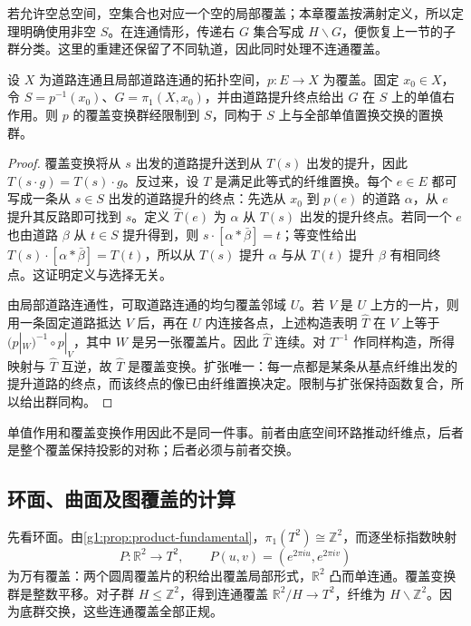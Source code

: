 若允许空总空间，空集合也对应一个空的局部覆盖；本章覆盖按满射定义，所以定理明确使用非空 \(S\)。在连通情形，传递右 \(G\) 集合写成 \(H\backslash G\)，便恢复上一节的子群分类。这里的重建还保留了不同轨道，因此同时处理不连通覆盖。

\begin{corollary}\label{g1:cor:deck-centralizer}
	设 \(X\) 为道路连通且局部道路连通的拓扑空间，\(p:E\to X\) 为覆盖。固定 \(x_0\in X\)，令 \(S=p^{-1}(x_0)\)、\(G=\pi_1(X,x_0)\)，并由道路提升终点给出 \(G\) 在 \(S\) 上的单值右作用。则 \(p\) 的覆盖变换群经限制到 \(S\)，同构于 \(S\) 上与全部单值置换交换的置换群。
\end{corollary}
\begin{proof}
	覆盖变换将从 \(s\) 出发的道路提升送到从 \(T(s)\) 出发的提升，因此 \(T(s\cdot g)=T(s)\cdot g\)。反过来，设 \(T\) 是满足此等式的纤维置换。每个 \(e\in E\) 都可写成一条从 \(s\in S\) 出发的道路提升的终点：先选从 \(x_0\) 到 \(p(e)\) 的道路 \(\alpha\)，从 \(e\) 提升其反路即可找到 \(s\)。定义 \(\widehat T(e)\) 为 \(\alpha\) 从 \(T(s)\) 出发的提升终点。若同一个 \(e\) 也由道路 \(\beta\) 从 \(t\in S\) 提升得到，则 \(s\cdot[\alpha*\bar\beta]=t\)；等变性给出 \(T(s)\cdot[\alpha*\bar\beta]=T(t)\)，所以从 \(T(s)\) 提升 \(\alpha\) 与从 \(T(t)\) 提升 \(\beta\) 有相同终点。这证明定义与选择无关。

	由局部道路连通性，可取道路连通的均匀覆盖邻域 \(U\)。若 \(V\) 是 \(U\) 上方的一片，则用一条固定道路抵达 \(V\) 后，再在 \(U\) 内连接各点，上述构造表明 \(\widehat T\) 在 \(V\) 上等于 \((p|_W)^{-1}\circ p|_V\)，其中 \(W\) 是另一张覆盖片。因此 \(\widehat T\) 连续。对 \(T^{-1}\) 作同样构造，所得映射与 \(\widehat T\) 互逆，故 \(\widehat T\) 是覆盖变换。扩张唯一：每一点都是某条从基点纤维出发的提升道路的终点，而该终点的像已由纤维置换决定。限制与扩张保持函数复合，所以给出群同构。
\end{proof}

单值作用和覆盖变换作用因此不是同一件事。前者由底空间环路推动纤维点，后者是整个覆盖保持投影的对称；后者必须与前者交换。

\subsection{环面、曲面及图覆盖的计算}
\label{g1:subsec:0505:04}

先看环面。由\cref{g1:prop:product-fundamental}，\(\pi_1(T^2)\cong\mathbb Z^2\)，而逐坐标指数映射
\[
	P:\mathbb R^2\longrightarrow T^2,\qquad P(u,v)=(e^{2\pi iu},e^{2\pi iv})
\]
为万有覆盖：两个圆周覆盖片的积给出覆盖局部形式，\(\mathbb R^2\) 凸而单连通。覆盖变换群是整数平移。对子群 \(H\le\mathbb Z^2\)，得到连通覆盖 \(\mathbb R^2/H\rightarrow T^2\)，纤维为 \(H\backslash\mathbb Z^2\)。因为底群交换，这些连通覆盖全部正规。

